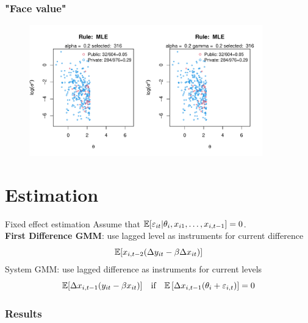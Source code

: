 \documentclass[10pt,mathserif,aspectratio=169]{beamer}
\begin{document}

\begin{frame}
  \frametitle{"Face value"}
  \begin{figure}
    \centering
    \includegraphics[width=0.9\textwidth]{../../Figures/2013-2022/GMM_fd/GLmix/Left_0.2_0.2_MLE.pdf}
  \end{figure}
\end{frame}

\section{Estimation}
\begin{frame}{Fixed effect estimation}
  Assume that $\mathbb{E}[\varepsilon_{it}|\theta_i,x_{i1},\ldots,x_{i,t-1}]=0$.\\
  \textbf{First Difference GMM}: use lagged level as instruments for current difference
  \begin{equation*}
    \mathbb{E}[x_{i,t-2}(\Delta y_{it}-\beta \Delta x_{it})]
  \end{equation*}
  System GMM: use lagged difference as instruments for current levels
  \begin{equation*}
    \mathbb{E}[\Delta x_{i,t-1}(y_{it}-\beta x_{it})] \quad \text{if}\quad \mathbb{E}\left[\Delta x_{i,t-1}(\theta_i+\varepsilon_{i,t})\right]=0
  \end{equation*}
\end{frame}

\begin{frame}
  \frametitle{Results}
  \begin{table}\fontsize{6pt}{6pt}\selectfont
    
  \end{table}
\end{frame}
\end{document}

